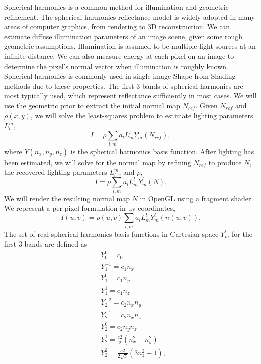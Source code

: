 \documentclass[10pt,twocolumn,letterpaper]{article}
\begin{document}
Spherical harmonics is a common method for illumination and geometric refinement. The spherical harmonics reflectance model is widely adopted in many areas of computer graphics, from rendering to 3D reconstruction. We can estimate diffuse illumination parameters of an image scene, given some rough geometric assumptions. Illumination is assumed to be multiple light sources at an infinite distance. We can also measure energy at each pixel on an image to determine the pixel's normal vector when illumination is roughly known. Spherical harmonics is commonly used in single image Shape-from-Shading methods due to these properties. The first 3 bands of spherical harmonics are most typically used, which represent reflectance sufficiently in most cases.
We will use the geometric prior to extract the initial normal map $N_{ref}$.  Given $N_{ref}$ and $\rho(x,y)$, we will solve the least-squares problem to estimate lighting parameters $L_l^m$,
\begin{equation}
I = \rho \sum_{l,m} a_l L_m^l Y_m^l(N_{ref}),
\end{equation}
where $Y(n_x,n_y,n_z)$ is the spherical harmonics basis function. After lighting has been estimated, we will solve for the normal map by refining $N_{ref}$ to produce $N$, the recovered lighting parameters $L_l^m$, and $\rho$,
\begin{equation}
I = \rho \sum_{l,m} a_l L_m^l Y_m^l(N).
\end{equation}
We will render the resulting normal map $N$ in OpenGL using a fragment shader. We represent a per-pixel formulation in uv-coordinates,
\begin{equation}
I(u,v) = \rho(u,v) \sum_{l,m} a_l L_m^l Y_m^l(n(u,v)).
\end{equation}
The set of real spherical harmonics basis functions in Cartesian space $Y_m^l$ for the first 3 bands are defined \cite{sfs} as 
\begin{equation}
\begin{split}
&Y_0^0 = c_0\\
&Y_1^{-1} = c_1 n_x\\
&Y_1^{0} = c_1 n_y\\
&Y_1^{1} = c_1 n_z\\
&Y_2^{-2} = c_2 n_x n_y\\
&Y_2^{-1} = c_2 n_x n_z\\
&Y_2^{0} = c_2 n_y n_z\\
&Y_2^{1} = \frac{c2}{2}(n_x^2 - n_y^2)\\
&Y_2^{2} = \frac{c2}{2\sqrt{3}}(3n_z^2 - 1),\\
\end{split}
\end{equation}
\end{document}
